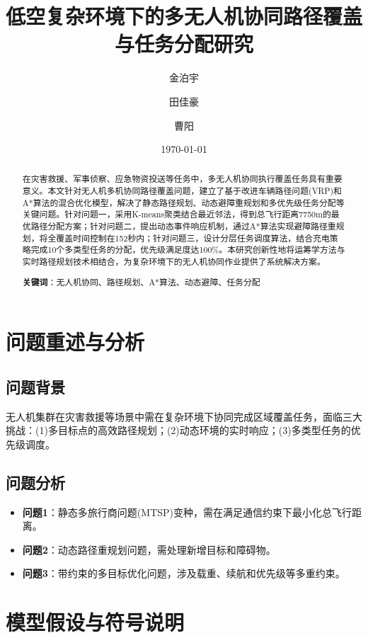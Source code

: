 \documentclass[12pt,fontset=adobe]{ctexart}
\title{低空复杂环境下的多无人机协同路径覆盖与任务分配研究}
\author{金泊宇\and 田佳豪 \and 曹阳}
\date{\today}
\begin{document}

\begin{abstract}
在灾害救援、军事侦察、应急物资投送等任务中，多无人机协同执行覆盖任务具有重要意义。本文针对无人机多机协同路径覆盖问题，建立了基于改进车辆路径问题(VRP)和A*算法的混合优化模型，解决了静态路径规划、动态避障重规划和多优先级任务分配等关键问题。针对问题一，采用K-means聚类结合最近邻法，得到总飞行距离7750m的最优路径分配方案；针对问题二，提出动态事件响应机制，通过A*算法实现避障路径重规划，将全覆盖时间控制在152秒内；针对问题三，设计分层任务调度算法，结合充电策略完成10个多类型任务的分配，优先级满足度达100\%。本研究创新性地将运筹学方法与实时路径规划技术相结合，为复杂环境下的无人机协同作业提供了系统解决方案。

\textbf{关键词}：无人机协同、路径规划、A*算法、动态避障、任务分配
\end{abstract}



\section{问题重述与分析}

\subsection{问题背景}
无人机集群在灾害救援等场景中需在复杂环境下协同完成区域覆盖任务，面临三大挑战：(1)多目标点的高效路径规划；(2)动态环境的实时响应；(3)多类型任务的优先级调度。

\subsection{问题分析}
\begin{itemize}
    \item \textbf{问题1}：静态多旅行商问题(MTSP)变种，需在满足通信约束下最小化总飞行距离。
    \item \textbf{问题2}：动态路径重规划问题，需处理新增目标和障碍物。
    \item \textbf{问题3}：带约束的多目标优化问题，涉及载重、续航和优先级等多重约束。
\end{itemize}

\section{模型假设与符号说明}
\end{document}
